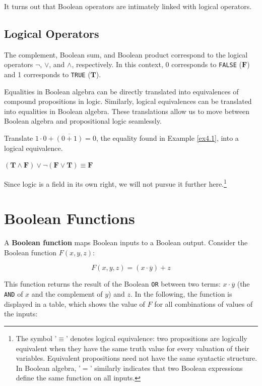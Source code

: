 It turns out that Boolean operators are intimately linked with logical operators.

\subsection*{Logical Operators}
The complement, Boolean sum, and Boolean product correspond to the logical operators $\neg$, $\vee$, and $\wedge$, respectively. In this context, 0 corresponds to \texttt{FALSE} ($\mathbf{F}$) and 1 corresponds to \texttt{TRUE} ($\mathbf{T}$). 

Equalities in Boolean algebra can be directly translated into equivalences of compound propositions in logic. Similarly, logical equivalences can be translated into equalities in Boolean algebra. These translations allow us to move between Boolean algebra and propositional logic seamlessly.

\begin{example}
    Translate $1 \cdot 0+\overline{(0+1)}=0$, the equality found in Example \ref{ex4.1}, into a logical equivalence.

    \begin{solution}
        $(\mathbf{T} \wedge \mathbf{F}) \vee \neg(\mathbf{F} \vee \mathbf{T}) \equiv \mathbf{F}$
    \end{solution}
    
\end{example}

Since logic is a field in its own right, we will not pursue it further here.\footnote{The symbol '$\equiv$' denotes logical equivalence: two propositions are logically equivalent when they have the same truth value for every valuation of their variables. Equivalent propositions need not have the same syntactic structure. In Boolean algebra, '$=$' similarly indicates that two Boolean expressions define the same function on all inputs.}

\section{Boolean Functions}

A \textbf{Boolean function} maps Boolean inputs to a Boolean output. Consider the Boolean function $F(x, y, z)$:

\[
F(x, y, z) = (x \cdot \overline{y}) + z
\]

This function returns the result of the Boolean \texttt{OR} between two terms: $x \cdot \overline{y}$ (the \texttt{AND} of $x$ and the complement of $y$) and $z$. In the following, the function is displayed in a table, which shows the value of $F$ for all combinations of values of the inputs:

